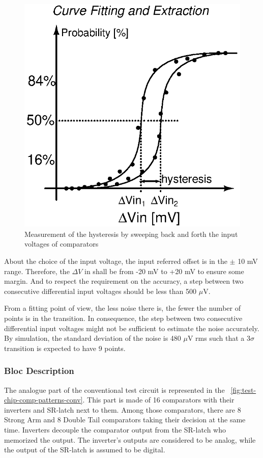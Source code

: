 \begin{figure}[htp]
    \centering
    \includegraphics[width=.3\textwidth]{Chapter5/Figs/comp_test/offset_conv_principle_hyst.ps}
    \caption{Measurement of the hysteresis by sweeping back and forth the input voltages of comparators}
    \label{fig:conv_offset_hyst}
\end{figure}

About the choice of the input voltage, the input referred offset is in the $\pm$ 10 mV range. Therefore, the $\Delta V$ in shall be from -20 mV to +20 mV to ensure some margin. And to respect the requirement on the accuracy, a step between two consecutive differential input voltages should be less than 500 $\mu$V.

From a fitting point of view, the less noise there is, the fewer the number of points is in the transition. In consequence, the step between two consecutive differential input voltages might not be sufficient to estimate the noise accurately. By simulation, the standard deviation of the noise is 480 $\mu$V rms such that a 3$\sigma$ transition is expected to have 9 points. 

\subsubsection{Bloc Description}
The analogue part of the conventional test circuit is represented in the \figurename~\ref{fig:test-chip-comp-patterns-conv}. This part is made of 16 comparators with their inverters and SR-latch next to them. Among those comparators, there are 8 Strong Arm and 8 Double Tail comparators taking their decision at the same time. Inverters decouple the comparator output from the SR-latch who memorized the output. The inverter's outputs are considered to be analog, while the output of the SR-latch is assumed to be digital.

